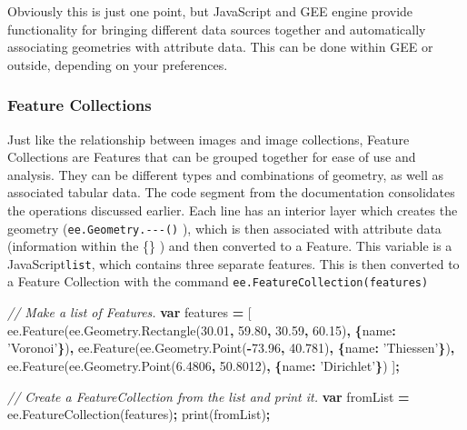 \documentclass[
]{article}
\newenvironment{Shaded}{\begin{snugshade}}{\end{snugshade}}
\newcommand{\AttributeTok}[1]{\textcolor[rgb]{0.77,0.63,0.00}{#1}}
\newcommand{\CommentTok}[1]{\textcolor[rgb]{0.56,0.35,0.01}{\textit{#1}}}
\newcommand{\DataTypeTok}[1]{\textcolor[rgb]{0.13,0.29,0.53}{#1}}
\newcommand{\FloatTok}[1]{\textcolor[rgb]{0.00,0.00,0.81}{#1}}
\newcommand{\KeywordTok}[1]{\textcolor[rgb]{0.13,0.29,0.53}{\textbf{#1}}}
\newcommand{\NormalTok}[1]{#1}
\newcommand{\OperatorTok}[1]{\textcolor[rgb]{0.81,0.36,0.00}{\textbf{#1}}}
\newcommand{\StringTok}[1]{\textcolor[rgb]{0.31,0.60,0.02}{#1}}
\newcommand{\VariableTok}[1]{\textcolor[rgb]{0.00,0.00,0.00}{#1}}
\begin{document}
Obviously this is just one point, but JavaScript and GEE engine provide functionality for bringing different data sources together and automatically associating geometries with attribute data. This can be done within GEE or outside, depending on your preferences.

\hypertarget{feature-collections}{%
\subsubsection{Feature Collections}\label{feature-collections}}

Just like the relationship between images and image collections, Feature Collections are Features that can be grouped together for ease of use and analysis. They can be different types and combinations of geometry, as well as associated tabular data. The code segment from the documentation consolidates the operations discussed earlier. Each line has an interior layer which creates the geometry (\texttt{ee.Geometry.-\/-\/-()} ), which is then associated with attribute data (information within the \{\} ) and then converted to a Feature. This variable is a JavaScript\texttt{list}, which contains three separate features. This is then converted to a Feature Collection with the command \texttt{ee.FeatureCollection(features)}

\begin{Shaded}
\begin{Highlighting}[]
\CommentTok{// Make a list of Features.}
\KeywordTok{var}\NormalTok{ features }\OperatorTok{=}\NormalTok{ [}
  \VariableTok{ee}\NormalTok{.}\AttributeTok{Feature}\NormalTok{(}\VariableTok{ee}\NormalTok{.}\VariableTok{Geometry}\NormalTok{.}\AttributeTok{Rectangle}\NormalTok{(}\FloatTok{30.01}\OperatorTok{,} \FloatTok{59.80}\OperatorTok{,} \FloatTok{30.59}\OperatorTok{,} \FloatTok{60.15}\NormalTok{)}\OperatorTok{,} \OperatorTok{\{}\DataTypeTok{name}\OperatorTok{:} \StringTok{'Voronoi'}\OperatorTok{\}}\NormalTok{)}\OperatorTok{,}
  \VariableTok{ee}\NormalTok{.}\AttributeTok{Feature}\NormalTok{(}\VariableTok{ee}\NormalTok{.}\VariableTok{Geometry}\NormalTok{.}\AttributeTok{Point}\NormalTok{(}\OperatorTok{-}\FloatTok{73.96}\OperatorTok{,} \FloatTok{40.781}\NormalTok{)}\OperatorTok{,} \OperatorTok{\{}\DataTypeTok{name}\OperatorTok{:} \StringTok{'Thiessen'}\OperatorTok{\}}\NormalTok{)}\OperatorTok{,}
  \VariableTok{ee}\NormalTok{.}\AttributeTok{Feature}\NormalTok{(}\VariableTok{ee}\NormalTok{.}\VariableTok{Geometry}\NormalTok{.}\AttributeTok{Point}\NormalTok{(}\FloatTok{6.4806}\OperatorTok{,} \FloatTok{50.8012}\NormalTok{)}\OperatorTok{,} \OperatorTok{\{}\DataTypeTok{name}\OperatorTok{:} \StringTok{'Dirichlet'}\OperatorTok{\}}\NormalTok{)}
\NormalTok{]}\OperatorTok{;}

\CommentTok{// Create a FeatureCollection from the list and print it.}
\KeywordTok{var}\NormalTok{ fromList }\OperatorTok{=} \VariableTok{ee}\NormalTok{.}\AttributeTok{FeatureCollection}\NormalTok{(features)}\OperatorTok{;}
\AttributeTok{print}\NormalTok{(fromList)}\OperatorTok{;}
\end{Highlighting}
\end{Shaded}
\end{document}
